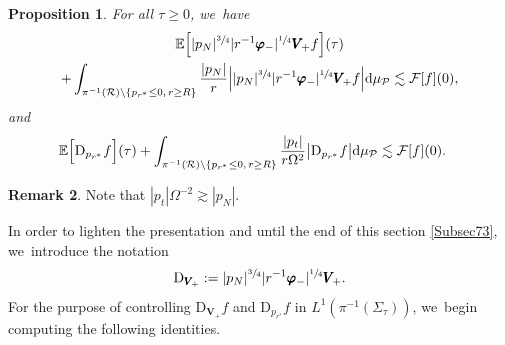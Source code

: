 \documentclass[JEP,XML,SOM,Unicode,published]{cedram}
\theoremstyle{plain}
\newtheorem{proposition}{Proposition}[section]
\theoremstyle{definition}
\newtheorem{remark}[proposition]{Remark}
\newcommand\dr{{\mathrm{d}}}
\begin{document}
\begin{proposition}\label{ProestivarphiminusVminus}
For all $\tau \geq 0$, we~have
\begin{multline*}
\mathbb{E} \Bigl[ |p_N|^{\sfrac{3}{4}} |r^{-1} \pmb{\varphi}_-|^{\sfrac{1}{4}} \pmb{V}_{\! +} f \Bigr](\tau) \\
 + \int_{\pi^{-1}(\mathcal{R})\setminus \{ p_{r^*} \leq 0, \, r \geq R \} } \frac{|p_N|}{r} \Big| |p_N|^{\sfrac{3}{4}} |r^{-1} \pmb{\varphi}_-|^{\sfrac{1}{4}} \pmb{V}_{\! +} f \Big| \dr \mu_{\mathcal{P}} \lesssim \mathcal{F}[f](0),
\end{multline*}
and
\begin{align*}
& \mathbb{E} \Bigl[ \mathrm{D}_{p_{r^*}} f \Bigr](\tau)+ \int_{\pi^{-1}(\mathcal{R})\setminus \{ p_{r^*} \leq 0, \, r \geq R \} } \frac{|p_t|}{r\Omega^2} \big|\mathrm{D}_{p_{r^*}} f \big| \dr \mu_{\mathcal{P}}\lesssim \mathcal{F}[f](0).
\end{align*}
\end{proposition}
\begin{remark}
Note that $|p_t|\Omega^{-2} \gtrsim |p_N|$.
\end{remark}

In order to lighten the presentation and until the end of this section \ref{Subsec73}, we~introduce the notation
\[
\mathrm{D}_{\pmb{V}_{\!+}} := |p_N|^{\sfrac{3}{4}} |r^{-1} \pmb{\varphi}_-|^{\sfrac{1}{4}} \pmb{V}_{\! +}.
\]
For the purpose of controlling $\mathrm{D}_{\pmb{V}_{\!+}} f$ and $\mathrm{D}_{p_{r^*}} f$ in $L^1(\pi^{-1}(\Sigma_\tau))$, we~begin computing the following identities.
\end{document}
